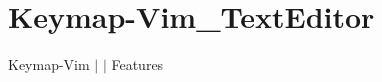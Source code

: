 \chapter{Keymap-\/\+Vim\+\_\+\+Text\+Editor }
\hypertarget{md__docs_2_text_editor_2_features_2_keymap-_vim___text_editor}{}\label{md__docs_2_text_editor_2_features_2_keymap-_vim___text_editor}
Keymap-\/\+Vim \texorpdfstring{$\vert$}{|}  \texorpdfstring{$\vert$}{|} Features



 